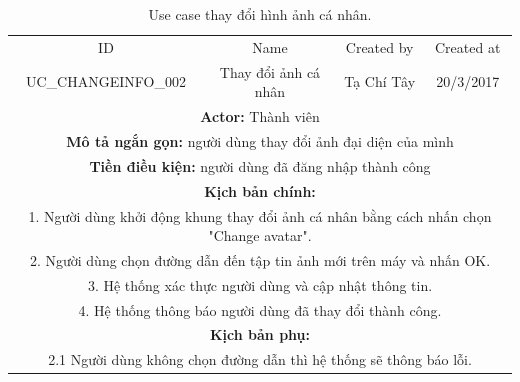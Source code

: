\documentclass[a4paper,12pt,oneside]{article}
\begin{document}
\begin{table}[!htp]
\centering
\begin{tabularx}{\linewidth}{ |c||c|c|c| }
\hline
ID & Name & Created by & Created at\\
UC\_CHANGEINFO\_002 & Thay đổi ảnh cá nhân & Tạ Chí Tây & 20/3/2017\\
\hline
\multicolumn{4}{|X|}{\textbf{Actor:} Thành viên }\\
\hline
\multicolumn{4}{|X|}{\textbf{Mô tả ngắn gọn:} người dùng thay đổi ảnh đại diện của mình}\\
\hline
\multicolumn{4}{|X|}{\textbf{Tiền điều kiện:} người dùng đã đăng nhập thành công}\\
\hline
\multicolumn{4}{|X|}{\textbf{Kịch bản chính:}}\\
\multicolumn{4}{|X|}{1. Người dùng khởi động khung thay đổi ảnh cá nhân bằng cách nhấn chọn "Change avatar".}\\
\multicolumn{4}{|X|}{
2.	Người dùng chọn đường dẫn đến tập tin ảnh mới trên máy và nhấn OK.}\\
\multicolumn{4}{|X|}{
3.	Hệ thống xác thực người dùng và cập nhật thông tin.}\\
\multicolumn{4}{|X|}{
4.	Hệ thống thông báo người dùng đã thay đổi thành công.}\\
\hline
\multicolumn{4}{|X|}{\textbf{Kịch bản phụ:}}\\
\multicolumn{4}{|X|}{2.1    Người dùng không chọn đường dẫn thì hệ thống sẽ thông báo lỗi.}\\
\hline
\end{tabularx}\\
\caption{Use case thay đổi hình ảnh cá nhân.}
\end{table}
\end{document}
